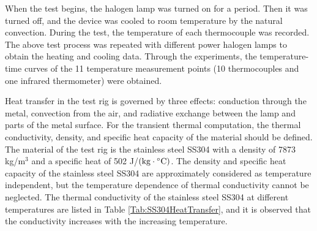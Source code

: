 When the test begins, the halogen lamp was turned on for a period. Then it was turned off, and the device was cooled to room temperature by the natural convection.
During the test, the temperature of each thermocouple was recorded.
The above test process was repeated with different power halogen lamps to obtain the heating and cooling data.
Through the experiments, the temperature-time curves of the 11 temperature measurement points (10 thermocouples and one infrared thermometer) were obtained.


Heat transfer in the test rig is governed by three effects: conduction through the metal, convection from the air, and radiative exchange between the lamp and parts of the metal surface. 
For the transient thermal computation, the thermal conductivity, density, and specific heat capacity of the material should be defined.
The material of the test rig is the stainless steel SS304 with a density of 7873 kg/m$^3$ and a specific heat of 502 J/$({\rm{kg}} \cdot {}^ \circ {\rm{C}})$. The density and specific heat capacity of the stainless steel SS304 are approximately considered as temperature independent, but the temperature dependence of thermal conductivity cannot be neglected. The thermal conductivity of the stainless steel SS304 at different temperatures are listed in Table \ref{Tab:SS304HeatTransfer}, and it is observed that the conductivity increases with the increasing temperature. 


